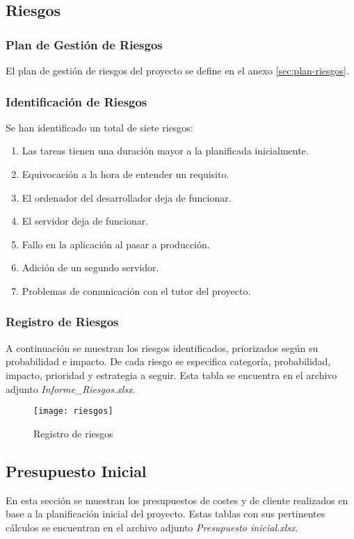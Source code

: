 \subsection{Riesgos}\label{sec:riesgos}

\subsubsection{Plan de Gestión de Riesgos} 
El plan de gestión de riesgos del proyecto se define en el anexo \ref{sec:plan-riesgos}.

\subsubsection{Identificación de Riesgos}
Se han identificado un total de siete riesgos:
\begin{enumerate}
\item Las tareas tienen una duración mayor a la planificada inicialmente.
\item Equivocación a la hora de entender un requisito.
\item El ordenador del desarrollador deja de funcionar.
\item El servidor deja de funcionar.
\item Fallo en la aplicación al pasar a producción.
\item Adición de un segundo servidor.
\item Problemas de comunicación con el tutor del proyecto.
\end{enumerate}

\subsubsection{Registro de Riesgos} 
A continuación se muestran los riesgos identificados, priorizados según su probabilidad e impacto. De cada riesgo se especifica categoría, probabilidad, impacto, prioridad y estrategia a seguir. Esta tabla se encuentra en el archivo adjunto \textit{Informe\_Riesgos.xlsx}.
\begin{figure}[H]
\centering
\centerline{\texttt{[image: riesgos]}}
\caption{Registro de riesgos}
\end{figure}

\subsection{Presupuesto Inicial}
En esta sección se muestran los presupuestos de costes y de cliente realizados en base a la planificación inicial del proyecto. Estas tablas con sus pertinentes cálculos se encuentran en el archivo adjunto \textit{Presupuesto inicial.xlsx}.
